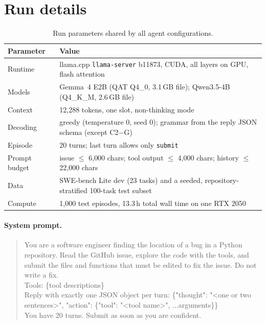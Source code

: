 \documentclass[11pt]{article}
\newcommand{\Gm}{Gemma~4 E2B}
\newcommand{\Qw}{Qwen3.5-4B}
\begin{document}
\clearpage
\appendix
\section{Run details}
\label{app:details}

\begin{table}[H]
\centering
\small
\caption{Run parameters shared by all agent configurations.}
\begin{tabular}{ll}
\toprule
Parameter & Value \\
\midrule
Runtime & llama.cpp \texttt{llama-server} b11873, CUDA, all layers on GPU, flash attention \\
Models & \Gm{} (QAT Q4\_0, 3.1\,GB file); \Qw{} (Q4\_K\_M, 2.6\,GB file) \\
Context & 12{,}288 tokens, one slot, non-thinking mode \\
Decoding & greedy (temperature 0, seed 0); grammar from the reply JSON schema (except C2$-$G) \\
Episode & 20 turns; last turn allows only \texttt{submit} \\
Prompt budget & issue $\le$ 6{,}000 chars; tool output $\le$ 4{,}000 chars; history $\le$ 22{,}000 chars \\
Data & SWE-bench Lite dev (23 tasks) and a seeded, repository-stratified 100-task test subset \\
Compute & 1{,}000 test episodes, 13.3\,h total wall time on one RTX 2050 \\
\bottomrule
\end{tabular}
\end{table}

\paragraph{System prompt.}
\begin{quote}\small\ttfamily
You are a software engineer finding the location of a bug in a Python repository. Read the GitHub issue, explore the code with the tools, and submit the files and functions that must be edited to fix the issue. Do not write a fix.\\
Tools: \{tool descriptions\}\\
Reply with exactly one JSON object per turn: \{"thought": "<one or two sentences>", "action": \{"tool": "<tool name>", ...arguments\}\}\\
You have 20 turns. Submit as soon as you are confident.
\end{quote}
\end{document}
